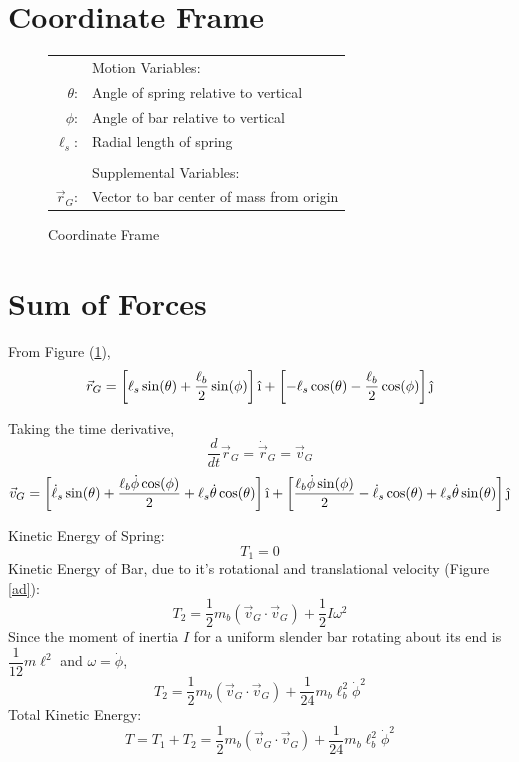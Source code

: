 \documentclass[12pt]{report}
\begin{document}
\begin{flushleft}
\section{Coordinate Frame} \label{section:coord}
\begin{figure}[!htp]
    \begin{minipage}[c]{.4\textwidth}
      \center
      
      \caption{Coordinate Frame}
      \label{coord}
      \vspace{2ex}
    \end{minipage}%
    \begin{minipage}[c]{.6\textwidth}
      \center
      \begin{tabular}{rl}
      & \quad Motion Variables: \\
      $\theta$:& Angle of spring relative to vertical\\
      $\phi$:& Angle of bar relative to vertical\\
      $\ell_s$:& Radial length of spring \\
      \\
      & \quad Supplemental Variables: \\
      $\vec{r}_G$:& Vector to bar center of mass from origin \\
    \end{tabular}
    \end{minipage}
\end{figure}
\newpage
\section{Sum of Forces}
From Figure (\ref{coord}),
$$\vec{r}_G = \left[\ell_s\sin(\theta) + \frac{\ell_b}{2}\sin(\phi)\right]\hat{\textrm{\i}}
 + \left[-\ell_s\cos(\theta) - \frac{\ell_b}{2}\cos(\phi)\right]\hat{\textrm{\j}}$$

Taking the time derivative,
$$\frac{d}{dt}\vec{r}_G = \dot{\vec{r}}_G = \vec{v}_G$$
$$
\vec{v}_G =
\left[\dot{\ell}_s\sin(\theta) + \frac{\ell_b\dot{\phi}\cos(\phi)}{2} +
\ell_s\dot{\theta}\cos(\theta)\right]\hat{\textrm{\i}} +
\left[\frac{\ell_b\dot{\phi}\sin(\phi)}{2} -
\dot{\ell}_s\cos(\theta) + \ell_s\dot{\theta}\sin(\theta)\right]\hat{\textrm{\j}}
$$

Kinetic Energy of Spring:
$$T_1 = 0$$
Kinetic Energy of Bar, due to it's rotational and translational velocity (Figure \ref{ad}):
$$T_2 = \frac{1}{2}m_{b}(\vec{v}_G \cdot \vec{v}_G) + \frac{1}{2}I\omega^2$$
Since the moment of inertia $I$ for a uniform slender bar rotating about its end is
$\dfrac{1}{12}m\ell^2$ and $\omega = \dot{\phi}$,
$$T_2 = \frac{1}{2}m_{b}(\vec{v}_G \cdot \vec{v}_G) + \frac{1}{24}m_{b}\ell_b^2\dot{\phi}^2$$
Total Kinetic Energy:
\begin{equation}
T = T_1 + T_2 = \frac{1}{2}m_{b}(\vec{v}_G \cdot \vec{v}_G) + \frac{1}{24}m_{b}\ell_b^2\dot{\phi}^2
\end{equation}


\end{flushleft}
\end{document}
